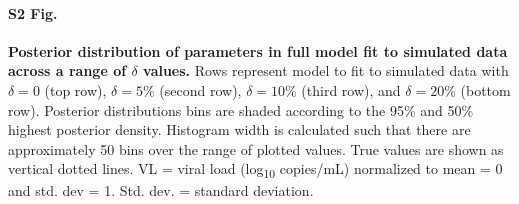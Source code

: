 \documentclass[10pt,letterpaper]{article}
\begin{document}
\paragraph*{S2 Fig.}
\label{full_simulation_sensitivity_delta}
{\bf Posterior distribution of parameters in full model fit to simulated data across a range of $\delta$ values.} Rows represent model to fit to simulated data with $\delta=0$ (top row), $\delta=5\%$ (second row), $\delta=10\%$ (third row), and $\delta=20\%$ (bottom row). Posterior distributions bins are shaded according to the 95\% and 50\% highest posterior density. Histogram width is calculated such that there are approximately 50 bins over the range of plotted values. True values are shown as vertical dotted lines. VL = viral load (log\textsubscript{10} copies/mL) normalized to mean = 0 and std. dev = 1. Std. dev. = standard deviation. 
\end{document}

